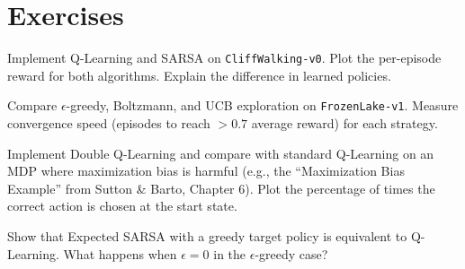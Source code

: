\section{Exercises}
\label{sec:q_exercises}

\begin{exercise}
Implement Q-Learning and SARSA on \texttt{CliffWalking-v0}. Plot the
per-episode reward for both algorithms. Explain the difference in learned
policies.
\end{exercise}

\begin{exercise}
Compare $\epsilon$-greedy, Boltzmann, and UCB exploration on
\texttt{FrozenLake-v1}. Measure convergence speed (episodes to reach
$>0.7$ average reward) for each strategy.
\end{exercise}

\begin{exercise}
Implement Double Q-Learning and compare with standard Q-Learning on an
MDP where maximization bias is harmful (e.g., the ``Maximization Bias
Example'' from Sutton \& Barto, Chapter 6). Plot the percentage of times
the correct action is chosen at the start state.
\end{exercise}

\begin{exercise}
Show that Expected SARSA with a greedy target policy is equivalent to
Q-Learning. What happens when $\epsilon = 0$ in the $\epsilon$-greedy case?
\end{exercise}
